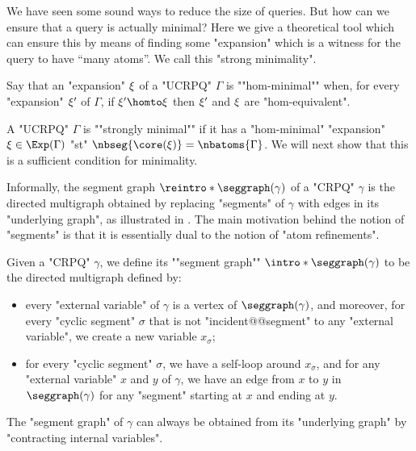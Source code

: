 We have seen some sound ways to reduce the size of queries. But how can we ensure that a query is actually minimal? Here we give a theoretical tool which can ensure this by means of finding some "expansion" which is a witness for the query to have ``many atoms''. We call this "strong minimality".

Say that an "expansion" $\xi$ of a "UCRPQ" $\Gamma$ is \AP""hom-minimal"" when, for every "expansion" $\xi'$ of $\Gamma$, if $\anexpansion' \homto \anexpansion$ then $\xi'$ and $\xi$ are "hom-equivalent". 

A "UCRPQ" $\Gamma$ is \AP""strongly minimal"" if 
it has a "hom-minimal" "expansion" $\anexpansion \in \Exp(\Gamma)$ "st" $\nbseg{\core(\anexpansion)} = \nbatoms{\Gamma}$. We will next show that this is a sufficient condition for minimality.

Informally, the segment graph $\reintro*\seggraph(\gamma)$ of a "CRPQ" $\gamma$ is the directed multigraph obtained by replacing "segments" of $\gamma$ with edges in its "underlying graph", as illustrated in . The main motivation behind the notion of "segments" is 
that it is essentially dual to the notion of "atom refinements".

\begin{definition}
	\AP\label{defn:segmentgraph}
	Given a "CRPQ" $\gamma$, we define its \AP""segment graph"" $\intro*\seggraph(\gamma)$
	to be the directed multigraph defined by:
	\begin{itemize}
		\item every "external variable" of $\gamma$ is a vertex of $\seggraph(\gamma)$,
			and moreover, for every "cyclic segment" $\sigma$
			that is not "incident@@segment" to any "external variable", we create a new variable
			$x_\sigma$;
		\item for every "cyclic segment" $\sigma$, we have a self-loop around $x_{\sigma}$,
			and for any "external variable" $x$ and $y$ of $\gamma$, we have an edge
			from $x$ to $y$ in $\seggraph(\gamma)$ for any "segment" starting at $x$ and
			ending at $y$.
	\end{itemize}
\end{definition}

\begin{fact}
	\AP\label{fact:segment-graph-is-contraction}
	The "segment graph" of $\gamma$ can always be obtained from its "underlying
	graph" by "contracting internal variables". 
\end{fact}


